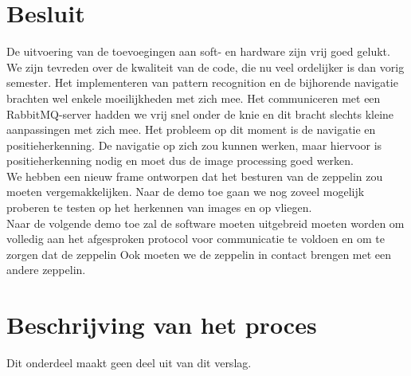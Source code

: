 \documentclass[eind]{penoverslag}
\begin{document}
\section{Besluit}
De uitvoering van de toevoegingen aan soft- en hardware zijn vrij goed gelukt. We zijn tevreden over de kwaliteit van de code, die nu veel ordelijker is dan vorig semester. Het implementeren van pattern recognition en de bijhorende navigatie brachten wel enkele moeilijkheden met zich mee. Het communiceren met een RabbitMQ-server hadden we vrij snel onder de knie en dit bracht slechts kleine aanpassingen met zich mee. Het probleem op dit moment is de navigatie en positieherkenning. De navigatie op zich zou kunnen werken, maar hiervoor is positieherkenning nodig en moet dus de image processing goed werken. \\
We hebben een nieuw frame ontworpen dat het besturen van de zeppelin zou moeten vergemakkelijken.
Naar de demo toe gaan we nog zoveel mogelijk proberen te testen op het herkennen van images en op vliegen. \\
Naar de volgende demo toe zal de software moeten uitgebreid moeten worden om volledig aan het afgesproken protocol voor communicatie te voldoen en om te zorgen dat de zeppelin Ook moeten we de zeppelin in contact brengen met een andere zeppelin. \\

\newpage\makeappendix

\section{Beschrijving van het proces}
Dit onderdeel maakt geen deel uit van dit verslag.
\end{document}
